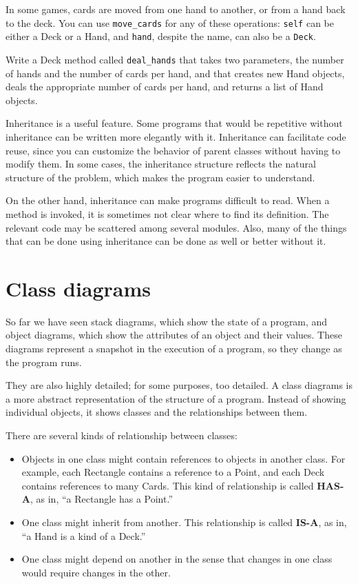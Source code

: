 \documentclass[10pt]{book}
\begin{document}
In some games, cards are moved from one hand to another,
or from a hand back to the deck.  You can use \verb"move_cards"
for any of these operations: {\tt self} can be either a Deck
or a Hand, and {\tt hand}, despite the name, can also be a {\tt Deck}.

\begin{ex}
Write a Deck method called \verb"deal_hands" that takes two
parameters, the number of hands and the number of cards per
hand, and that creates new Hand objects, deals the appropriate
number of cards per hand, and returns a list of Hand objects.
\end{ex}

Inheritance is a useful feature.  Some programs that would be
repetitive without inheritance can be written more elegantly
with it.  Inheritance can facilitate code reuse, since you can
customize the behavior of parent classes without having to modify
them.  In some cases, the inheritance structure reflects the natural
structure of the problem, which makes the program easier to
understand.

On the other hand, inheritance can make programs difficult to read.
When a method is invoked, it is sometimes not clear where to find its
definition.  The relevant code may be scattered among several modules.
Also, many of the things that can be done using inheritance can be
done as well or better without it.  


\section{Class diagrams}

So far we have seen stack diagrams, which show the state of
a program, and object diagrams, which show the attributes
of an object and their values.  These diagrams represent a snapshot
in the execution of a program, so they change as the program
runs.

They are also highly detailed; for some purposes, too
detailed.  A class diagrams is a more abstract representation
of the structure of a program.  Instead of showing individual
objects, it shows classes and the relationships between them.

There are several kinds of relationship between classes:

\begin{itemize}

\item Objects in one class might contain references to objects
in another class.  For example, each Rectangle contains a reference
to a Point, and each Deck contains references to many Cards.
This kind of relationship is called {\bf HAS-A}, as in, ``a Rectangle
has a Point.''

\item One class might inherit from another.  This relationship
is called {\bf IS-A}, as in, ``a Hand is a kind of a Deck.''

\item One class might depend on another in the sense that changes
in one class would require changes in the other.

\end{itemize}
\end{document}
